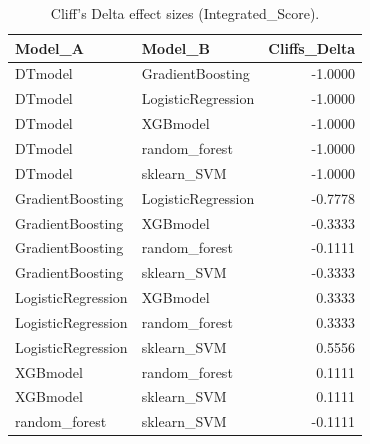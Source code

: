 \begin{table}[t]
\centering
\begin{tabular}{llr}
\toprule
Model_A & Model_B & Cliffs_Delta \\
\midrule
DTmodel & GradientBoosting & -1.0000 \\
DTmodel & LogisticRegression & -1.0000 \\
DTmodel & XGBmodel & -1.0000 \\
DTmodel & random_forest & -1.0000 \\
DTmodel & sklearn_SVM & -1.0000 \\
GradientBoosting & LogisticRegression & -0.7778 \\
GradientBoosting & XGBmodel & -0.3333 \\
GradientBoosting & random_forest & -0.1111 \\
GradientBoosting & sklearn_SVM & -0.3333 \\
LogisticRegression & XGBmodel & 0.3333 \\
LogisticRegression & random_forest & 0.3333 \\
LogisticRegression & sklearn_SVM & 0.5556 \\
XGBmodel & random_forest & 0.1111 \\
XGBmodel & sklearn_SVM & 0.1111 \\
random_forest & sklearn_SVM & -0.1111 \\
\bottomrule
\end{tabular}
\caption{Cliff's Delta effect sizes (Integrated_Score).}
\label{tab:cliffs_Integrated_Score}
\end{table}